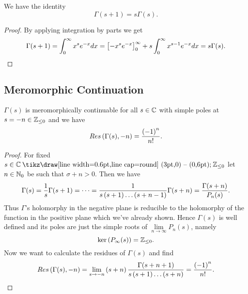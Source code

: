 \begin{theorem}
	We have the identity
\begin{equation*}
	\Gamma(s + 1) = s \Gamma(s).
\end{equation*}
\end{theorem}
\begin{proof}
	By applying integration by parts we get
\begin{equation*}
	\Gamma(s + 1) = \int _0 ^\infty x^{s} e^{-x} dx =\left[-x^s e^{-x}\right] _0 ^\infty + s \int _0 ^\infty x^{s - 1} e^{-x} dx = s\Gamma(s).
\end{equation*}
\end{proof}


\subsection{Meromorphic Continuation}


\begin{theorem}
	$\Gamma(s)$ is meromorphically continuable for all $s \in \mathbb{C}$ with simple poles at $s = -n\in \mathbb{Z} _{\leq 0}$ and we have
\begin{equation*}
	Res\left(\Gamma(s), -n\right) = \frac{\left(-1\right)^n}{n!}.
\end{equation*}
\end{theorem}
\begin{proof}
	For fixed $s \in \field{C} \mysetminus \field{Z}_{\leq 0}$ let $n \in \mathbb{N}_0$ be such that $\sigma + n > 0$. Then we have
\begin{equation*}
	\Gamma(s) = \frac{1}{s} \Gamma(s + 1) = \dots = \frac{1}{s \left(s + 1\right) \dots \left(s + n - 1\right)} \Gamma(s + n) = \frac{\Gamma(s + n)}{P_n(s)}.
\end{equation*}
	Thus $\Gamma$'s holomorphy in the negative plane is reducible to the holomorphy of the function in the positive plane which we've already shown. Hence $\Gamma(s)$ is well defined and its poles are just the simple roots of $\lim\limits_{n \to \infty} P_n(s)$, namely
\begin{equation*}
	\ker\left(P_\infty(s)\right) = \mathbb{Z}_{\leq 0}.
\end{equation*}
	Now we want to calculate the residues of $\Gamma(s)$ and find
\begin{equation*}
	Res\left(\Gamma(s), -n\right) = \lim\limits_{s \to -n} \left(s + n\right) \frac{\Gamma(s + n + 1)}{s \left(s + 1\right) \dots \left(s + n\right)} = \frac{\left(-1\right)^n}{n!}.
\end{equation*}
\end{proof}



